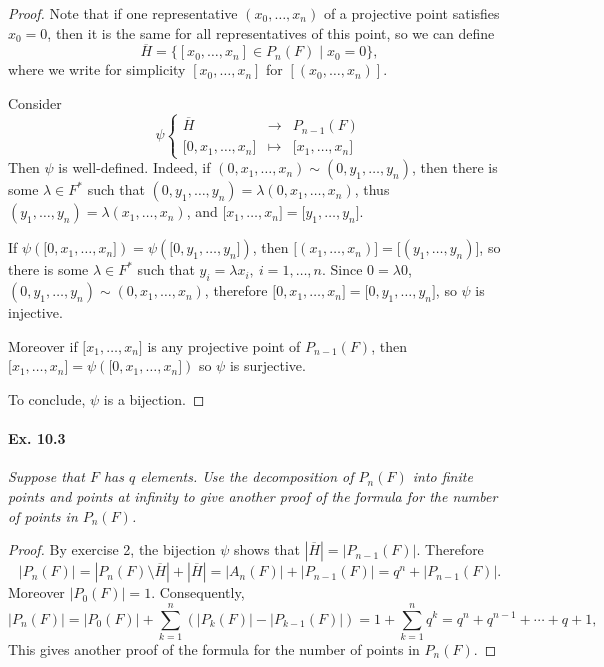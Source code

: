 \documentclass[11pt,a4paper]{article}
\begin{document}
\begin{proof}
Note that if one representative $(x_0,\ldots,x_n)$ of a projective point satisfies $x_0 = 0$, then it is the same for all representatives of this point, so we can define
$$\overline{H} = \{[x_0,\ldots,x_n] \in P_n(F) \mid x_0 = 0\},$$
where we write for simplicity $[x_0,\ldots,x_n]$ for $[(x_0,\ldots,x_n)]$.

Consider
$$
\psi
\left\{
\begin{array}{ccl}
\overline{H} & \to &P_{n-1}(F)\\
{[}0,x_1,\ldots,x_n{]}& \mapsto & {[}x_1,\ldots,x_n{]}
\end{array}
\right.
$$
Then $\psi$ is well-defined. Indeed, if $(0,x_1,\ldots,x_n) \sim (0,y_1,\ldots,y_n)$, then there is some $\lambda \in F^*$ such that $(0,y_1,\ldots,y_n) = \lambda (0,x_1,\ldots,x_n)$, thus $(y_1,\ldots,y_n) = \lambda (x_1,\ldots,x_n)$, and $ {[}x_1,\ldots,x_n{]} =  {[}y_1,\ldots,y_n{]}$.

If $ \psi({[}0,x_1,\ldots,x_n{]}) =  \psi({[}0,y_1,\ldots,y_n{]})$, then ${[}(x_1,\ldots,x_n){]} = {[}(y_1,\ldots,y_n){]}$, so there is some $\lambda \in F^*$ such that $y_i = \lambda x_i, \ i=1,\ldots,n$. Since $0 = \lambda 0$, $(0,y_1,\ldots,y_n) \sim (0,x_1,\ldots,x_n)$, therefore ${[}0,x_1,\ldots,x_n{]} = {[}0,y_1,\ldots,y_n{]}$, so $\psi$ is injective.

Moreover if ${[}x_1,\ldots,x_n{]} $ is any projective point of $P_{n-1}(F)$, then ${[}x_1,\ldots,x_n{]}  =  \psi({[}0,x_1,\ldots,x_n{]})$ so $\psi$ is surjective. 

To conclude, $\psi$ is a bijection.
\end{proof}

\paragraph{Ex. 10.3} {\it Suppose that $F$ has $q$ elements. Use the decomposition of $P_n(F)$ into finite points and points at infinity to give another proof of the formula for the number of points in $P_n(F)$.
}
\begin{proof}

By exercise 2, the bijection $\psi$ shows that $|\overline{H}| = |P_{n-1}(F)|$. Therefore
$$|P_n(F)| = |P_n(F) \setminus \overline{H} | + |\overline{H} | = |A_n(F)| + |P_{n-1}(F)| = q^n +  |P_{n-1}(F)|.$$
Moreover $|P_0(F)| = 1$. Consequently,
$$|P_n(F)|  = |P_0(F)|  + \sum_{k=1}^n (|P_k(F)| - |P_{k-1}(F)| )= 1 + \sum_{k=1}^n q^k = q^n + q^{n-1} + \cdots + q + 1,$$
This gives another proof of the formula for the number of points in $P_n(F)$.
\end{proof}
\end{document}
